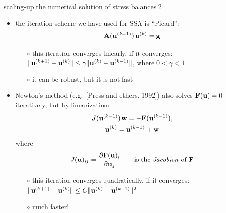 \begin{frame}{scaling-up the numerical solution of stress balances 2}

\begin{itemize}
\item the iteration scheme we have used for SSA is ``Picard'':
	$$\mathbf{A}(\mathbf{u}^{(k-1)})\,\mathbf{u}^{(k)} = \mathbf{g}$$
\vspace{-0.2in}
  \begin{itemize}
  \item[$\circ$] this iteration converges linearly, if it converges:  $\|\mathbf{u}^{(k+1)} - \mathbf{u}^{(k)}\| \le \gamma \|\mathbf{u}^{(k)} - \mathbf{u}^{(k-1)}\|$, where $0<\gamma<1$
  \item[$\circ$] it can be robust, but it is not fast
  \end{itemize}	
\item Newton's method (e.g.~[Press and others, 1992])\nocite{Pressetal} also solves $\mathbf{F}(\mathbf{u}) = 0$ iteratively, but by linearization:
\begin{gather*}
J(\mathbf{u}^{(k-1)})\,\mathbf{w} = - \mathbf{F}(\mathbf{u}^{(k-1)}), \\
\mathbf{u}^{(k)} = \mathbf{u}^{(k-1)} + \mathbf{w}
\end{gather*}
\vspace{-0.1in}
where
   $$J(\mathbf{u})_{ij} = \frac{\partial \mathbf{F}(\mathbf{u})_i}{\partial \mathbf{u}_j} \qquad \text{is the \emph{Jacobian} of } \mathbf{F}$$
\vspace{-0.1in}
  \begin{itemize}
  \item[$\circ$] this iteration converges quadratically, if it converges:  $\|\mathbf{u}^{(k+1)} - \mathbf{u}^{(k)}\| \le C \|\mathbf{u}^{(k)} - \mathbf{u}^{(k-1)}\|^2$
  \item[$\circ$] much faster!
  \end{itemize}	
\end{itemize}
\end{frame}


